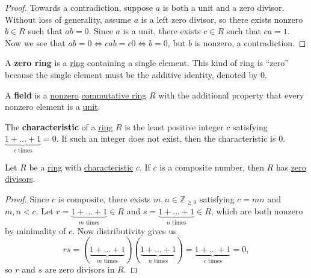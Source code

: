 \documentclass{scrartcl}
\begin{document}
\begin{proof}
    Towards a contradiction, suppose $a$ is both a unit and a zero divisor.
    Without loss of generality, assume $a$ is a left zero divisor, so there exists nonzero $b\in R$ such that $ab=0$.
    Since $a$ is a unit, there exists $c\in R$ such that $ca=1$.
    Now we see that $ab=0\iff cab=c0\iff b=0$, but $b$ is nonzero, a contradiction.
\end{proof}

\begin{definition}
    \label{def:nonzero ring}
    A \textbf{zero ring} is a \hyperref[def:ring]{ring} containing a single element.
    This kind of ring is ``zero'' because the single element must be the additive identity, denoted by $0$.
\end{definition}

\begin{definition}[Field]
    \label{def:field}
    A \textbf{field} is a \hyperref[def:nonzero ring]{nonzero} \hyperref[def:commutative ring]{commutative ring} $R$
    with the additional property that every nonzero element is a \hyperref[def:unit]{unit}.
\end{definition}

\begin{definition}[Characteristic]
    \label{def:characteristic}
    The \textbf{characteristic} of a \hyperref[def:ring]{ring} $R$ is the least positive integer $c$ satisfying
    $\underbrace{1+\dots+1}_{c\text{ times}}=0$.
    If such an integer does not exist, then the characteristic is $0$.
\end{definition}

\begin{proposition}
    Let $R$ be a \hyperref[def:ring]{ring} with \hyperref[def:characteristic]{characteristic} $c$.
    If $c$ is a composite number, then $R$ has \hyperref[def:zero divisor]{zero divisors}.
\end{proposition}

\begin{proof}
    Since $c$ is composite, there exists $m,n\in\mathbb{Z}_{\geq 0}$ satisfying $c=mn$ and $m,n<c$.
    Let $r=\underbrace{1+\dots+1}_{m\text{ times}}\in R$ and $s=\underbrace{1+\dots+1}_{n\text{ times}}\in R$, which
    are both nonzero by minimality of $c$.
    Now distributivity gives us
    \[rs=(\underbrace{1+\dots+1}_{m\text{ times}})(\underbrace{1+\dots+1}_{n\text{ times}})=\underbrace{1+\dots+1}_{c\text{ times}}=0,\]
    so $r$ and $s$ are zero divisors in $R$.
\end{proof}
\end{document}
